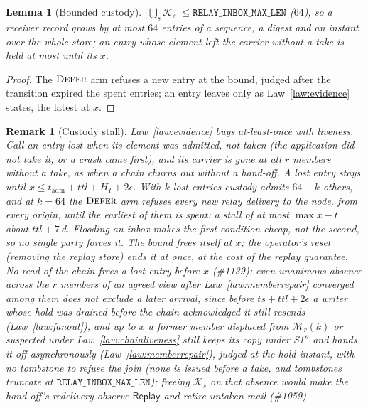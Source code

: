 \documentclass[journal]{IEEEtran}
\newtheorem{lemma}{Lemma}
\newtheorem{remark}{Remark}
\newcommand{\Defer}{\textsc{Defer}}
\newcommand{\K}{\mathcal{K}}
\newcommand{\issue}[1]{\#{#1}}
\newcommand{\Mem}{\mathcal{M}}
\begin{document}
\begin{lemma}[Bounded custody]\label{lem:bound}
$|\bigcup_s\K_s|\le\mathtt{RELAY\_INBOX\_MAX\_LEN}$ ($64$), so a receiver record grows by
at most $64$ entries of a sequence, a digest and an instant over the whole store; an entry
whose element left the carrier without a take is held at most until its $x$.
\end{lemma}
\begin{proof}
The $\Defer$ arm refuses a new entry at the bound, judged after the transition expired the
spent entries; an entry leaves only as Law~\ref{law:evidence} states, the latest at $x$.
\end{proof}

\begin{remark}[Custody stall]\label{rem:stall}
Law~\ref{law:evidence} buys at-least-once with liveness.  Call an entry \emph{lost} when its
element was admitted, not taken (the application did not take it, or a crash came first),
and its carrier is gone at all $r$ members without a take, as when a chain churns out without
a hand-off.  A lost entry stays until $x\le t_{\mathrm{adm}}+\mathit{ttl}+H_I+2\epsilon$.  With
$k$ lost entries custody admits $64-k$ others, and at $k=64$ the $\Defer$ arm refuses every new
relay delivery to the node, from every origin, until the earliest of them is spent: a stall of
at most $\max x-t$, about $\mathit{ttl}+7$\,d.  Flooding an inbox makes the first condition
cheap, not the second, so no single party forces it.  The bound frees itself at $x$; the
operator's reset (removing the replay store) ends it at once, at the cost of the replay
guarantee.  No read of the chain frees a lost entry before $x$ (\issue{1139}): even unanimous
absence across the $r$ members of an agreed view after Law~\ref{law:memberrepair} converged
among them does not exclude a later arrival, since before $\mathit{ts}+\mathit{ttl}+2\epsilon$
a writer whose hold was drained before the chain acknowledged it still resends
(Law~\ref{law:fanout}), and up to $x$ a former member displaced from $\Mem_r(k)$ or suspected
under Law~\ref{law:chainliveness} still keeps its copy under S1$''$ and hands it off
asynchronously (Law~\ref{law:memberrepair}), judged at the hold instant, with no tombstone to
refuse the join (none is issued before a take, and tombstones truncate at
$\mathtt{RELAY\_INBOX\_MAX\_LEN}$); freeing $\K_s$ on that absence would make the hand-off's
redelivery observe $\mathsf{Replay}$ and retire untaken mail (\issue{1059}).
\end{remark}
\end{document}
